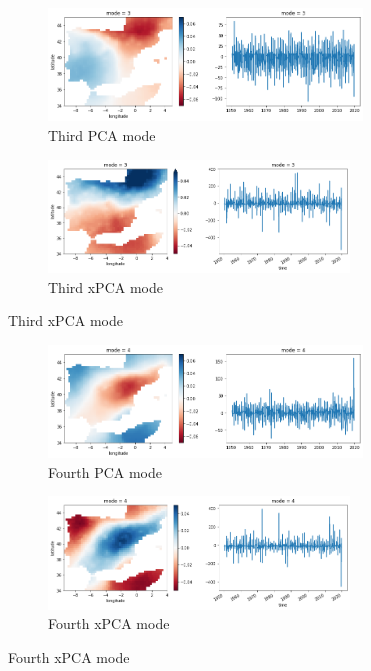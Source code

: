 \documentclass[11pt, oneside]{book}
\theoremstyle{plain}
\theoremstyle{remark}
\begin{document}
\begin{figure}[h!]
\centering
\begin{subfigure}{.5\textwidth}
    \centering
    \includegraphics[width=.95\linewidth, height=3cm]{spain-mode3}
    \caption{Third PCA mode}
\end{subfigure}%
\begin{subfigure}{.5\textwidth}
    \centering
    \includegraphics[width=.95\linewidth, height=3cm]{spain-tran-mode3}
    \caption{Third xPCA mode}
\end{subfigure}
\end{figure}
\begin{figure}[h!]
\centering
\begin{subfigure}{.5\textwidth}
    \centering
    \includegraphics[width=.95\linewidth, height=3cm]{spain-mode4}
    \caption{Fourth PCA mode}
\end{subfigure}%
\begin{subfigure}{.5\textwidth}
    \centering
    \includegraphics[width=.95\linewidth, height=3cm]{spain-tran-mode4}
    \caption{Fourth xPCA mode}
\end{subfigure}
\end{figure}
\end{document}
